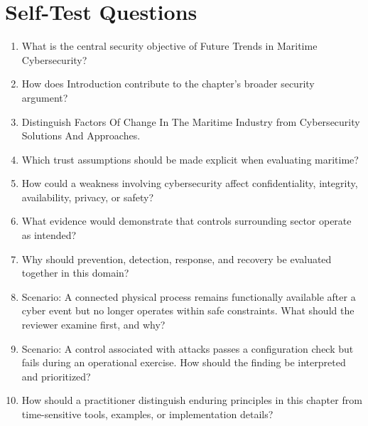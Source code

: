 \documentclass[11pt]{article}
\begin{document}
\section*{Self-Test Questions}
\begin{enumerate}
\item What is the central security objective of Future Trends in Maritime Cybersecurity?
\item How does Introduction contribute to the chapter's broader security argument?
\item Distinguish Factors Of Change In The Maritime Industry from Cybersecurity Solutions And Approaches.
\item Which trust assumptions should be made explicit when evaluating maritime?
\item How could a weakness involving cybersecurity affect confidentiality, integrity, availability, privacy, or safety?
\item What evidence would demonstrate that controls surrounding sector operate as intended?
\item Why should prevention, detection, response, and recovery be evaluated together in this domain?
\item Scenario: A connected physical process remains functionally available after a cyber event but no longer operates within safe constraints. What should the reviewer examine first, and why?
\item Scenario: A control associated with attacks passes a configuration check but fails during an operational exercise. How should the finding be interpreted and prioritized?
\item How should a practitioner distinguish enduring principles in this chapter from time-sensitive tools, examples, or implementation details?
\end{enumerate}
\end{document}
